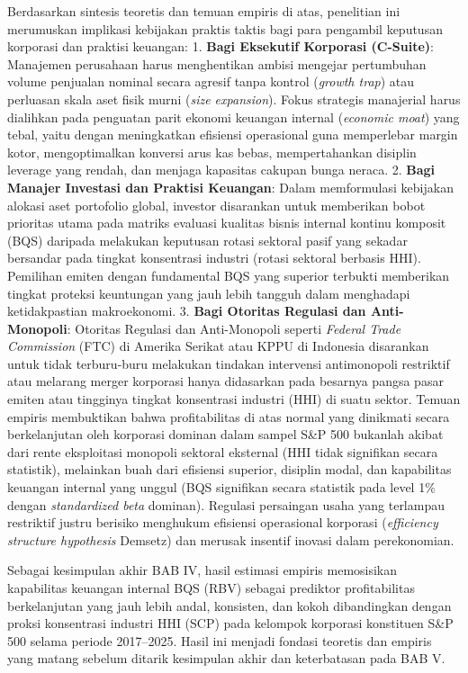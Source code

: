 \documentclass[12pt,a4paper]{article}
\begin{document}
Berdasarkan sintesis teoretis dan temuan empiris di atas, penelitian ini
merumuskan implikasi kebijakan praktis taktis bagi para pengambil
keputusan korporasi dan praktisi keuangan: 1. \textbf{Bagi Eksekutif
Korporasi (C-Suite)}: Manajemen perusahaan harus menghentikan ambisi
mengejar pertumbuhan volume penjualan nominal secara agresif tanpa
kontrol (\emph{growth trap}) atau perluasan skala aset fisik murni
(\emph{size expansion}). Fokus strategis manajerial harus dialihkan pada
penguatan parit ekonomi keuangan internal (\emph{economic moat}) yang
tebal, yaitu dengan meningkatkan efisiensi operasional guna memperlebar
margin kotor, mengoptimalkan konversi arus kas bebas, mempertahankan
disiplin leverage yang rendah, dan menjaga kapasitas cakupan bunga
neraca. 2. \textbf{Bagi Manajer Investasi dan Praktisi Keuangan}: Dalam
memformulasi kebijakan alokasi aset portofolio global, investor
disarankan untuk memberikan bobot prioritas utama pada matriks evaluasi
kualitas bisnis internal kontinu komposit (BQS) daripada melakukan
keputusan rotasi sektoral pasif yang sekadar bersandar pada tingkat
konsentrasi industri (rotasi sektoral berbasis HHI). Pemilihan emiten
dengan fundamental BQS yang superior terbukti memberikan tingkat
proteksi keuntungan yang jauh lebih tangguh dalam menghadapi
ketidakpastian makroekonomi. 3. \textbf{Bagi Otoritas Regulasi dan
Anti-Monopoli}: Otoritas Regulasi dan Anti-Monopoli seperti
\emph{Federal Trade Commission} (FTC) di Amerika Serikat atau KPPU di
Indonesia disarankan untuk tidak terburu-buru melakukan tindakan
intervensi antimonopoli restriktif atau melarang merger korporasi hanya
didasarkan pada besarnya pangsa pasar emiten atau tingginya tingkat
konsentrasi industri (HHI) di suatu sektor. Temuan empiris membuktikan
bahwa profitabilitas di atas normal yang dinikmati secara berkelanjutan
oleh korporasi dominan dalam sampel S\&P 500 bukanlah akibat dari rente
eksploitasi monopoli sektoral eksternal (HHI tidak signifikan secara
statistik), melainkan buah dari efisiensi superior, disiplin modal, dan
kapabilitas keuangan internal yang unggul (BQS signifikan secara
statistik pada level 1\% dengan \emph{standardized beta} dominan).
Regulasi persaingan usaha yang terlampau restriktif justru berisiko
menghukum efisiensi operasional korporasi (\emph{efficiency structure
hypothesis} Demsetz) dan merusak insentif inovasi dalam perekonomian.

Sebagai kesimpulan akhir BAB IV, hasil estimasi empiris memosisikan
kapabilitas keuangan internal BQS (RBV) sebagai prediktor profitabilitas
berkelanjutan yang jauh lebih andal, konsisten, dan kokoh dibandingkan
dengan proksi konsentrasi industri HHI (SCP) pada kelompok korporasi
konstituen S\&P 500 selama periode 2017--2025. Hasil ini menjadi fondasi
teoretis dan empiris yang matang sebelum ditarik kesimpulan akhir dan
keterbatasan pada BAB V.
\end{document}
